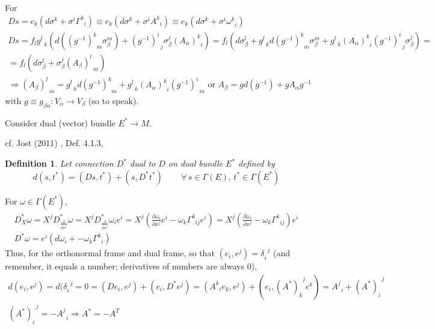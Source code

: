 \documentclass[10pt]{amsart}
\newtheorem{definition}{Definition}
\begin{document}
\begin{multicols*}{2}
For 
\[
\begin{gathered}
  Ds = e_k ( d\sigma^k + \sigma^i \Gamma^k_{ \; \; i} ) \equiv e_k (d\sigma^k + \sigma^i A^k_{ \; \; i }) \equiv e_k ( d\sigma^k + \sigma^i \omega^k_{ \; \; i } ) \\
  Ds = f_l g^l_{ \; \; k} (d ((g^{-1})^k_{ \; \; m} \sigma^m_{\beta} ) + (g^{-1})^i_{ \; \; j} \sigma_{\beta}^j (A_{\alpha})^k_{ \; \; i} ) = f_l ( d\sigma^l_{ \beta} + g^l_{ \; \; k} d(g^{-1})^k_{ \; \; m} \sigma^m_{ \beta } + g^l_{ \; \; k} (A_{\alpha})^k_{ \; \; i } (g^{-1})^i_{ \; \; j} \sigma^j_{ \beta } ) = \\
  = f_l ( d\sigma^l_{\beta} + \sigma^j_{\beta} (A_{\beta})^l_{ \; \; m } ) \\ 
  \Longrightarrow (A_{\beta})^l_{ \; \; m} = g^l_{ \; \; k} d(g^{-1})^k_{ \; \; m} + g^l_{ \; \; k} (A_{\alpha})^k_{ \; \; i } (g^{-1})^i_{ \; \; m } \text{ or } A_{\beta} = g d(g^{-1}) + g A_{\alpha} g^{-1}
\end{gathered}
\]
with $g \equiv g_{\beta \alpha} : V_{\alpha} \to V_{\beta}$ (so to speak).  

Consider dual (vector) bundle $E^* \to M$.  

cf. Jost (2011) \cite{JJost2011}, Def. 4.1.3,
\begin{definition}
Let connection $D^*$ dual to $D$ on dual bundle $E^*$ defined by 
\[
d(s,t^*) = (Ds,t^*) + (s,D^*t^*) \qquad \, \forall \, s \in \Gamma(E), \, t^* \in \Gamma(E^*)
\]
\end{definition}
For $\omega \in \Gamma(E^*)$, 
\[
\begin{gathered}
  D^*_X \omega = X^j D^*_{\frac{ \partial }{ \partial x^j} } \omega = X^j D^*_{\frac{ \partial }{ \partial x^j} } \omega_i e^i = X^j \left( \frac{ \partial \omega_i}{ \partial x^j} e^i  - \omega_k \Gamma^k_{ \; \; ij} e^i \right) = X^j \left( \frac{ \partial \omega_i }{ \partial x^j} - \omega_k \Gamma^k_{ \; \; ij} \right) e^i  \\ 
  D^* \omega = e^i( d\omega_i + - \omega_k \Gamma^k_{ \; \; i } )
\end{gathered}
\]
Thus, for the orthonormal frame and dual frame, so that $(e_i , e^j) = \delta_i^{ \; \; j}$ (and remember, it equals a number; derivatives of numbers are always $0$), 
\[
\begin{gathered}
  d(e_i, e^j) = d(\delta_i^{ \; \; j} = 0 = (De_i, e^j ) + (e_i, D^* e^j) = (A^k_{ \; \; i} e_k ,e^j) + (e_i, (A^*)_k^{ \; \; j} e^k ) = A^j_{ \; \; i} + (A^*)_i^{ \; \; j} \\
  (A^*)_i^{ \; \; j} = -A^j_{ \; \; i} \Longrightarrow A^* = -A^T
\end{gathered}
\]


\end{multicols*}
\end{document}

